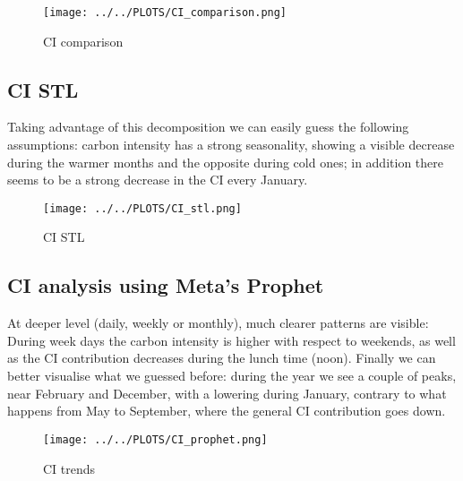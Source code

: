 \begin{figure}[H]
\centering
\texttt{[image: ../../PLOTS/CI\_comparison.png]}
\captionsetup{skip=-10pt}
\caption{CI comparison}
\label{CI_comparison}
\end{figure}

\subsection{CI STL}
Taking advantage of this decomposition we can easily guess the following assumptions: carbon intensity has a strong seasonality, showing a visible decrease during the warmer months and the opposite during cold ones; in addition there seems to be a strong decrease in the CI every January.

\vspace{-15pt}

\begin{figure}[H]
\centering
\texttt{[image: ../../PLOTS/CI\_stl.png]}
\captionsetup{skip=-10pt}
\caption{CI STL}
\label{CI_stl}
\end{figure}

\subsection{CI analysis using Meta's Prophet}
At deeper level (daily, weekly or monthly), much clearer patterns are visible: \\
During week days the carbon intensity is higher with respect to weekends, as well as the CI contribution decreases during the lunch time (noon). Finally we can better visualise what we guessed before: during the year we see a couple of peaks, near February and December, with a lowering during January, contrary to what happens from May to September, where the general CI contribution goes down.

\vspace{-15pt}

\begin{figure}[H]
\centering
\texttt{[image: ../../PLOTS/CI\_prophet.png]}
\captionsetup{skip=-10pt}
\caption{CI trends}
\label{CI_prophet}
\end{figure}